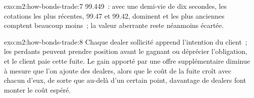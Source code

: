 \begin{solution}{exo:m2:how-bonds-trade:7}
99.449~: avec une demi-vie de dix secondes, les cotations les plus récentes, 99.47 et 99.42, dominent et
les plus anciennes comptent beaucoup moins~; la valeur aberrante reste néanmoins écartée.
\end{solution}

\begin{solution}{exo:m2:how-bonds-trade:8}
Chaque dealer sollicité apprend l'intention du client~; les perdants peuvent prendre position avant le
gagnant ou déprécier l'obligation, et le client paie cette fuite. Le gain apporté par une
offre supplémentaire diminue à mesure que l'on ajoute des dealers, alors que le coût de la fuite croît avec chacun d'eux, de sorte que
au-delà d'un certain point, davantage de dealers font monter le coût espéré.
\end{solution}

